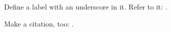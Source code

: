 \ifx\undefined\eplain  \fi

Define a label with an underscore in it. 
Refer to it: .

Make a citation, too: \cite{bib_uscore}.




\bye


